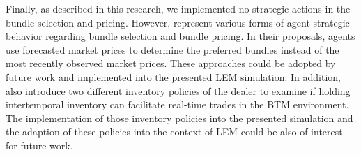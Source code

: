 Finally, as described in this research, we implemented no strategic
actions in the bundle selection and pricing. 
However,  represent various 
forms of agent strategic behavior regarding bundle selection 
and bundle pricing.
In their proposals, agents use forecasted market prices to determine the preferred bundles
instead of the most recently observed market prices. 
These approaches could be adopted by future work and implemented
into the presented LEM simulation.
In addition,  also introduce two
different inventory policies of the dealer to examine if holding intertemporal inventory can facilitate real-time trades in the BTM environment. The implementation of those inventory policies
into the presented simulation and the adaption of these policies
into the context of LEM could be also of interest for future work. 








\begin{comment}

\end{comment}